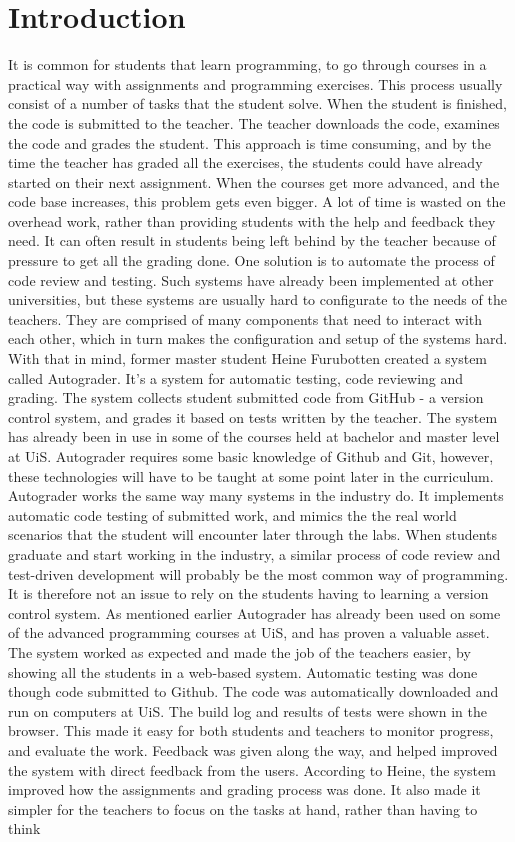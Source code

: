 \chapter*{Introduction}
It is common for students that learn programming, to go through courses in a practical way with assignments and programming exercises. This process usually consist of a number of tasks that the student solve. When the student is finished, the code is submitted to the teacher. The teacher downloads the code, examines the code and grades the student. This approach is time consuming, and by the time the teacher has graded all the exercises, the students could have already started on their next assignment. When the courses get more advanced, and the code base increases, this problem gets even bigger. A lot of time is wasted on the overhead work, rather than providing students with the help and feedback they need. It can often result in students being left behind by the teacher because of pressure to get all the grading done. One solution is to automate the process of code review and testing. Such systems have already been implemented at other universities, but these systems are usually hard to configurate to the needs of the teachers. They are comprised of many components that need to interact with each other, which in turn makes the configuration and setup of the systems hard. With that in mind, former master student Heine Furubotten created a system called Autograder. It's a system for automatic testing, code reviewing and grading. The system collects student submitted code from GitHub - a version control system, and grades it based on tests written by the teacher. The system has already been in use in some of the courses held at bachelor and master level at UiS. Autograder requires some basic knowledge of Github and Git, however, these technologies will have to be taught at some point later in the curriculum. \\Autograder works the same way many systems in the industry do. It implements automatic code testing of submitted work, and mimics the the real world scenarios that the student will encounter later through the labs. When students graduate and start working in the industry, a similar process of code review and test-driven development will probably be the most common way of programming. It is therefore not an issue to rely on the students having to learning a version control system. As mentioned earlier Autograder has already been used on some of the advanced programming courses at UiS, and has proven a valuable asset. The system worked as expected and made the job of the teachers easier, by showing all the students in a web-based system. Automatic testing was done though code submitted to Github. The code was automatically downloaded and run on computers at UiS. The build log and results of tests were shown in the  browser. This made it easy for both students and teachers to monitor progress, and evaluate the work. Feedback was given along the way, and helped improved the system with direct feedback from the users. According to Heine, the system improved how the assignments and grading process was done. It also made it simpler for the teachers to focus on the tasks at hand, rather than having to think 